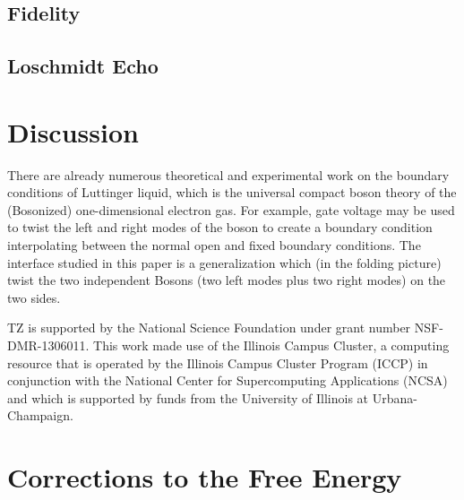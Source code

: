 \documentclass[preprint, prb]{revtex4-1}
\begin{document}
\subsection{Fidelity}
\subsection{Loschmidt Echo}

\section{Discussion}

There are already numerous theoretical and experimental work on the boundary conditions of Luttinger liquid\cite{schmeltzer_zero_1999,anfuso_luttinger_2003,voit_bounded_2000,fabrizio_interacting_1995,egger_applying_1998}, which is the universal compact boson theory of the (Bosonized) one-dimensional electron gas\cite{giamarchi_quantum_2015}. For example, gate voltage \cite{egger_applying_1998} may be used to twist the left and right modes of the boson to create a boundary condition interpolating between the normal open and fixed boundary conditions. The interface studied in this paper is a generalization which (in the folding picture) twist the two independent Bosons (two left modes plus two right modes) on the two sides. 

\begin{acknowledgments}
    TZ is supported by the National Science Foundation under grant number NSF-DMR-1306011.
    This work made use of the Illinois Campus Cluster, a computing resource that is operated by the
    Illinois Campus Cluster Program (ICCP) in conjunction with the National Center for
    Supercomputing Applications (NCSA) and which is supported by funds from the University of
    Illinois at Urbana-Champaign.
\end{acknowledgments}

\appendix
\section{Corrections to the Free Energy}
\label{app:F_correction}

\end{document}
